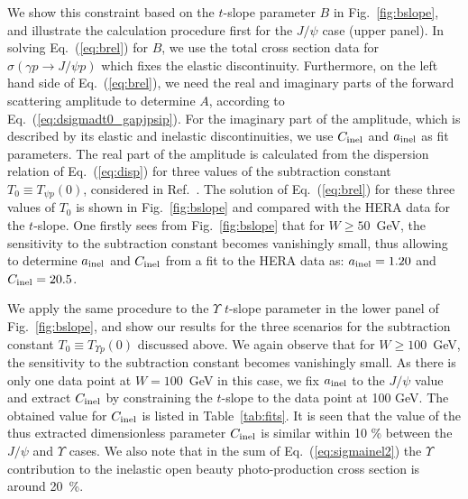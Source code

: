 \documentclass[prd,amsmath,%
twocolumn,floatfix,amssymb, preprintnumbers, linenumbers,nofootinbib, superscriptaddress]{revtex4}
\begin{document}
We show this constraint based on the $t$-slope parameter $B$ in Fig.~\ref{fig:bslope}, and illustrate the calculation procedure first for the $J/\psi$ case (upper panel).
In solving Eq.~(\ref{eq:brel}) for $B$, we use the total cross section data for $\sigma(\gamma p \to J/\psi p)$ which fixes the elastic discontinuity. Furthermore, on the left hand side of Eq.~(\ref{eq:brel}), we need the real and imaginary parts of the forward scattering amplitude to determine $A$, according to Eq.~(\ref{eq:dsigmadt0_gapjpsip}). 
For the imaginary part of the amplitude, which is described by its elastic and inelastic discontinuities, we use $C_{\rm inel}$ and $a_{\rm inel}$ as fit parameters.   
The real part of the amplitude is calculated from the dispersion relation of Eq.~(\ref{eq:disp}) for three values of the subtraction constant $T_0 \equiv T_{\psi p}(0)$, considered in Ref.~\cite{Gryniuk:2016mpk}. The solution of Eq.~(\ref{eq:brel}) for these three values of $T_0$ is shown in Fig.~\ref{fig:bslope} and compared with the HERA data for the $t$-slope. One firstly sees from Fig.~\ref{fig:bslope} that for $W \geq 50$~GeV, the sensitivity to the subtraction constant becomes vanishingly small, thus allowing to determine $a_{\rm inel}$ and $C_{\rm inel}$ from a fit to the HERA data as: $a_{\rm inel} = 1.20$ and 
$C_{\rm inel} = 20.5$. 


We apply the same procedure to the $\Upsilon$ $t$-slope parameter in the lower panel of Fig.~\ref{fig:bslope}, and  show our results for the three scenarios for the subtraction constant $T_0 \equiv T_{\Upsilon p}(0)$ discussed above. We again observe that for $W \geq 100$~GeV, the sensitivity to the subtraction constant becomes vanishingly small. 
As there is only one data point at $W = 100$~GeV in this case, we fix $a_{\rm inel}$ to the $J/\psi$ value and extract $C_{\rm inel}$ by constraining the $t$-slope to the data point at 100 GeV. The obtained value for $C_{\rm inel}$ is listed in Table~\ref{tab:fits}. It is seen that the value of the thus extracted dimensionless parameter $C_{\rm inel}$ is similar within 10 \% between the $J/\psi$ and $\Upsilon$ cases. We also note that in the sum of Eq.~(\ref{eq:sigmainel2}) the $\Upsilon$ contribution  to the inelastic open beauty photo-production cross section is around 20~\%. 
\end{document}

